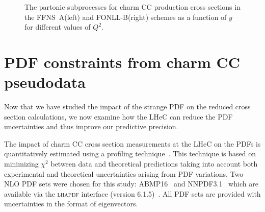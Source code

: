 \documentclass[pdftex,twocolumn,epjc3]{svjour3}          %
\newcommand{\abmp} {ABMP16\xspace}
\newcommand{\nnpdf} {NNPDF3.1\xspace}
\newcommand{\chisq}{\ensuremath{\chi^2}\xspace}
\newcommand{\lhapdf} {{\textsc{lhapdf}}\xspace}
\newcommand{\fonll} {{FONLL-B}\xspace}
\newcommand{\ffns} {{FFNS~A}\xspace}
\begin{document}
\begin{figure}
    \centering
    \caption{The partonic subprocesses for charm CC production cross sections in the \ffns (left) and \fonll (right) schemes as a function of $y$ for different values of $Q^2$.}
    \label{fig:partonic-y}
\end{figure}



\section{PDF constraints from charm CC pseudodata}
\label{sec:PDF}

Now that we have  studied the impact of the strange PDF on the
reduced cross section calculations, we now examine how the LHeC can
reduce the PDF uncertainties and thus  improve our predictive precision. 

The impact of charm CC cross section measurements at the LHeC on the
PDFs is quantitatively estimated using a profiling
technique~\cite{Paukkunen:2014zia}. This technique is based on
minimizing \chisq between data and theoretical predictions taking into
account both experimental and theoretical uncertainties arising from
PDF variations. Two NLO PDF sets were chosen for this study:
\abmp~\cite{Alekhin:2018pai} and \nnpdf~\cite{Ball:2017nwa} which are available
via the \lhapdf interface (version 6.1.5)~\cite{Buckley:2014ana}.  All
PDF sets are provided with uncertainties in the format of
eigenvectors.
\end{document}
